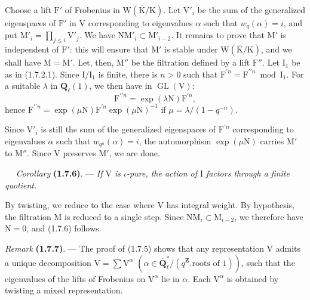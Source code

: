 \documentclass[11pt,leqno]{article}
\newcommand{\Page}[1]{\ifvmode\noindent\else\unskip\ \fi{\footnotesize\textcolor{gray}{[p.\,#1]}}\ \ignorespaces}
\begin{document}
Choose a lift \(\mathrm{F}'\) of Frobenius in \(\mathrm{W}(\overline{\mathrm{K}}/\mathrm{K})\). Let \(\mathrm{V}'_i\) be the sum of the generalized eigenspaces of \(\mathrm{F}'\) in \(\mathrm{V}\) corresponding to eigenvalues \(\alpha\) such that \(w_q(\alpha)=i\), and put \(\mathrm{M}'_i=\prod\limits_{j\leq i}\mathrm{V}'_j\). We have \(\mathrm{N}\mathrm{M}'_i\subset\mathrm{M}'_{i-2}\). It remains to prove that \(\mathrm{M}'\) is independent of \(\mathrm{F}'\): this will ensure that \(\mathrm{M}'\) is stable under \(\mathrm{W}(\overline{\mathrm{K}}/\mathrm{K})\), and we shall have \(\mathrm{M}=\mathrm{M}'\). Let, then, \(\mathrm{M}''\) be the filtration defined by a lift \(\mathrm{F}''\). Let \(\mathrm{I}_1\) be as in (1.7.2.1). Since \(\mathrm{I}/\mathrm{I}_1\) is finite, there is \(n>0\) such that \(\mathrm{F}^{\prime n}=\mathrm{F}^{\prime\prime n}\bmod\mathrm{I}_1\). For a suitable \(\lambda\) in \(\mathbf{Q}_\ell(1)\), we then have in \(\operatorname{GL}(\mathrm{V})\):
\[
\mathrm{F}^{\prime\prime n}=\exp(\lambda\mathrm{N})\mathrm{F}^{\prime n},
\]
hence \(\mathrm{F}^{\prime\prime n}=\exp(\mu\mathrm{N})\mathrm{F}^{\prime n}\exp(\mu\mathrm{N})^{-1}\) if \(\mu=\lambda/(1-q^{-n})\).

Since \(\mathrm{V}'_i\) is still the sum of the generalized eigenspaces of \(\mathrm{F}^{\prime n}\) corresponding to eigenvalues \(\alpha\) such that \(w_{q^n}(\alpha)=i\), the automorphism \(\exp(\mu\mathrm{N})\) carries \(\mathrm{M}'\) to \(\mathrm{M}''\). Since \(\mathrm{V}\) preserves \(\mathrm{M}'\), we are done.

\Page{172}
\textit{Corollary} \textbf{(1.7.6)}. — \textit{If \(\mathrm{V}\) is \(\iota\)-pure, the action of \(\mathrm{I}\) factors through a finite quotient.}

By twisting, we reduce to the case where \(\mathrm{V}\) has integral weight. By hypothesis, the filtration \(\mathrm{M}\) is reduced to a single step. Since \(\mathrm{N}\mathrm{M}_i\subset\mathrm{M}_{i-2}\), we therefore have \(\mathrm{N}=0\), and (1.7.6) follows.

\textit{Remark} \textbf{(1.7.7)}. — The proof of (1.7.5) shows that any representation \(\mathrm{V}\) admits a unique decomposition \(\mathrm{V}=\sum\mathrm{V}^{\alpha}\) \((\alpha\in\overline{\mathbf{Q}}_\ell^*/(q^{\mathbf{Z}}.\text{roots of }1))\), such that the eigenvalues of the lifts of Frobenius on \(\mathrm{V}^{\alpha}\) lie in \(\alpha\). Each \(\mathrm{V}^{\alpha}\) is obtained by twisting a mixed representation.
\end{document}
